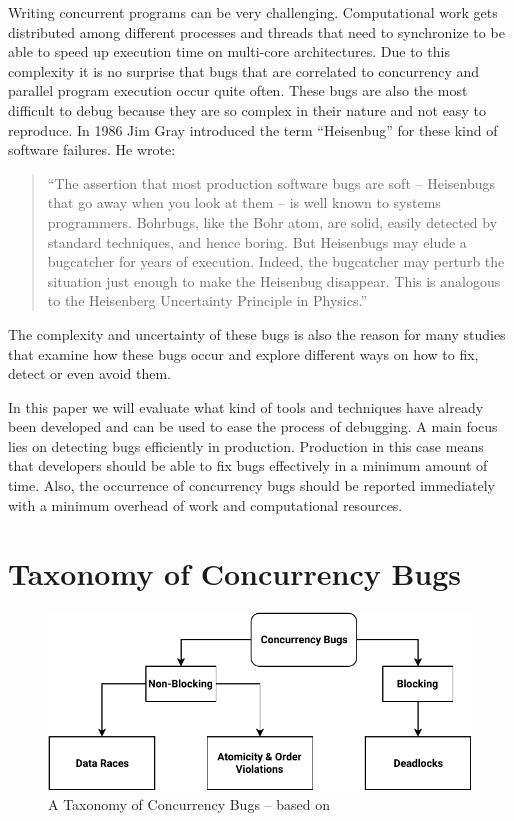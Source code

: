 \documentclass[conference]{IEEEtran}
\begin{document}
Writing concurrent programs can be very challenging.
Computational work gets distributed among different processes and threads that need to synchronize to be able to speed up execution time on multi-core architectures.
Due to this complexity it is no surprise that bugs that are correlated to concurrency and parallel program execution occur quite often.
These bugs are also the most difficult to debug because they are so complex in their nature and not easy to reproduce.\cite{tu2019go}
In 1986 Jim Gray introduced the term ``Heisenbug'' for these kind of software failures.
He wrote:

\begin{quote}
``The assertion that most production software bugs are soft -- Heisenbugs that go away when you look at them -- is well known to systems programmers. Bohrbugs, like the Bohr atom, are solid, easily detected by standard techniques, and hence boring. But Heisenbugs may elude a bugcatcher for years of execution. Indeed, the bugcatcher may perturb the situation just enough to make the Heisenbug disappear. This is analogous to the Heisenberg Uncertainty Principle in Physics.''\cite{gray1986computers}
\end{quote}

The complexity and uncertainty of these bugs is also the reason for many studies that examine how these bugs occur and explore different ways on how to fix, detect or even avoid them.

In this paper we will evaluate what kind of tools and techniques have already been developed and can be used to ease the process of debugging.
A main focus lies on detecting bugs efficiently in production.
Production in this case means that developers should be able to fix bugs effectively in a minimum amount of time.
Also, the occurrence of concurrency bugs should be reported immediately with a minimum overhead of work and computational resources.


\section{Taxonomy of Concurrency Bugs}
\begin{figure}
    \includegraphics[width=\linewidth]{figures/ConcurrencyBugClasses.pdf}
    \caption{A Taxonomy of Concurrency Bugs -- based on\cite{tchamgoue2012testing}}
    \label{fig:classes}
\end{figure}
\end{document}
